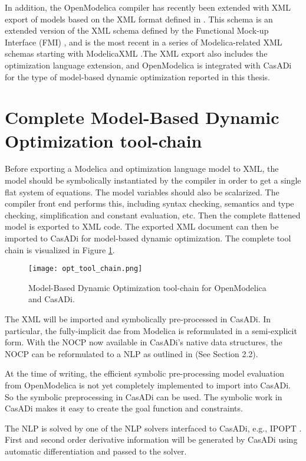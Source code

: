 In addition, the OpenModelica compiler has recently been extended with XML export of models \cite{alachew} based on the XML
format defined in \cite{xml}. This schema is an extended version of the XML schema
defined by the Functional Mock-up Interface (FMI) \cite{fmi}, and is the most recent in a series of
Modelica-related XML schemas starting with ModelicaXML \cite{pop}.The XML export also includes the
optimization language extension, and OpenModelica is integrated with CasADi for the type of model-based dynamic optimization reported in this thesis.

\section{Complete Model-Based Dynamic Optimization tool-chain}
\label{sec:optimizationtoolchain}

Before exporting a Modelica and optimization language model to XML, the model should be symbolically
instantiated by the compiler in order to get a single flat system of equations. The model variables should also be
scalarized. The compiler front end performs this, including syntax checking, semantics and type checking, simplification
and constant evaluation, etc. Then the complete flattened model is exported to XML code. The exported
XML document can then be imported to CasADi for model-based dynamic optimization. The complete tool chain is
visualized in Figure \ref{fig:optimizationtoolchain}.

\begin{figure}
	\texttt{[image: opt\_tool\_chain.png]}
	\caption{Model-Based Dynamic Optimization tool-chain for OpenModelica and CasADi.}
	\label{fig:optimizationtoolchain}
\end{figure}

The XML will be imported and symbolically pre-processed in CasADi. In particular, the fully-implicit \acrshort{dae} from
Modelica is reformulated in a semi-explicit form. With the NOCP now available in CasADi’s native data structures, the
NOCP can be reformulated to a NLP as outlined in \cite{alachewoptimization} (See Section 2.2).

At the time of writing, the efficient symbolic pre-processing model evaluation from OpenModelica is not yet completely
implemented to import into CasADi. So the symbolic preprocessing in CasADi can be used. The symbolic work in CasADi makes it easy to create the goal function and constraints.

The NLP is solved by one of the NLP solvers interfaced to CasADi, e.g., IPOPT \cite{wachter}. First and second order derivative information will be generated by CasADi using automatic differentiation and passed to the solver.

